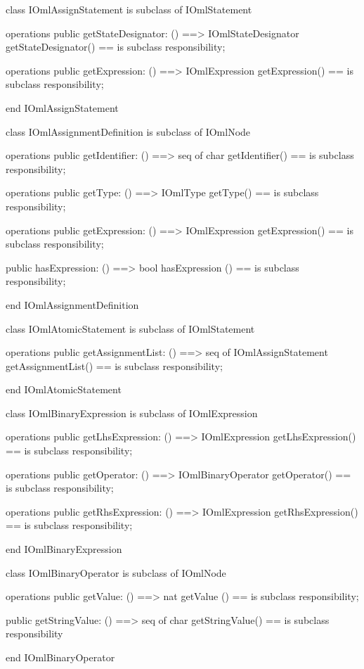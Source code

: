 \begin{vdm_al}
class IOmlAssignStatement
 is subclass of IOmlStatement

operations
  public getStateDesignator: () ==> IOmlStateDesignator
  getStateDesignator() == is subclass responsibility;

operations
  public getExpression: () ==> IOmlExpression
  getExpression() == is subclass responsibility;

end IOmlAssignStatement
\end{vdm_al}

\begin{vdm_al}
class IOmlAssignmentDefinition
 is subclass of IOmlNode

operations
  public getIdentifier: () ==> seq of char
  getIdentifier() == is subclass responsibility;

operations
  public getType: () ==> IOmlType
  getType() == is subclass responsibility;

operations
  public getExpression: () ==> IOmlExpression
  getExpression() == is subclass responsibility;

  public hasExpression: () ==> bool
  hasExpression () == is subclass responsibility;

end IOmlAssignmentDefinition
\end{vdm_al}

\begin{vdm_al}
class IOmlAtomicStatement
 is subclass of IOmlStatement

operations
  public getAssignmentList: () ==> seq of IOmlAssignStatement
  getAssignmentList() == is subclass responsibility;

end IOmlAtomicStatement
\end{vdm_al}

\begin{vdm_al}
class IOmlBinaryExpression
 is subclass of IOmlExpression

operations
  public getLhsExpression: () ==> IOmlExpression
  getLhsExpression() == is subclass responsibility;

operations
  public getOperator: () ==> IOmlBinaryOperator
  getOperator() == is subclass responsibility;

operations
  public getRhsExpression: () ==> IOmlExpression
  getRhsExpression() == is subclass responsibility;

end IOmlBinaryExpression
\end{vdm_al}

\begin{vdm_al}
class IOmlBinaryOperator
 is subclass of IOmlNode

operations
  public getValue: () ==> nat
  getValue () == is subclass responsibility;

  public getStringValue: () ==> seq of char
  getStringValue() == is subclass responsibility

end IOmlBinaryOperator
\end{vdm_al}

